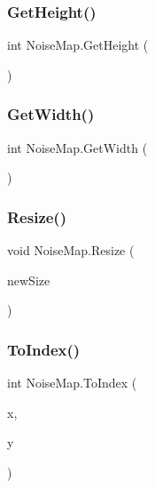 \subsubsection{\texorpdfstring{Get\+Height()}{GetHeight()}}
{\footnotesize\ttfamily int Noise\+Map.\+Get\+Height (\begin{DoxyParamCaption}{ }\end{DoxyParamCaption})}

\mbox{\label{class_noise_map_af3cba5e8724a9234b800836ed242e9aa}} 
\subsubsection{\texorpdfstring{Get\+Width()}{GetWidth()}}
{\footnotesize\ttfamily int Noise\+Map.\+Get\+Width (\begin{DoxyParamCaption}{ }\end{DoxyParamCaption})}

\mbox{\label{class_noise_map_a202d577f21b8d8264ffe78cea2149cb8}} 
\subsubsection{\texorpdfstring{Resize()}{Resize()}}
{\footnotesize\ttfamily void Noise\+Map.\+Resize (\begin{DoxyParamCaption}\item[{Vector2\+Int}]{new\+Size }\end{DoxyParamCaption})}

\mbox{\label{class_noise_map_a833fc31b1d8e9792634f22e74f099625}} 
\subsubsection{\texorpdfstring{To\+Index()}{ToIndex()}}
{\footnotesize\ttfamily int Noise\+Map.\+To\+Index (\begin{DoxyParamCaption}\item[{int}]{x,  }\item[{int}]{y }\end{DoxyParamCaption})}




